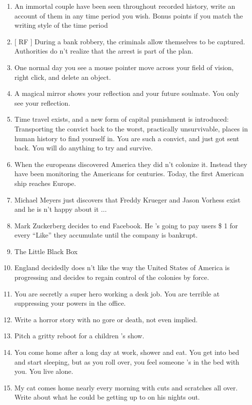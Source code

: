 \begin{enumerate}[noitemsep]
    \item An immortal couple have been seen throughout recorded history, write an account of them in any time period you wish. Bonus points if you match the writing style of the time period
    \item {[} RF {]} During a bank robbery, the criminals allow themselves to be captured. Authorities do n't realize that the arrest is part of the plan.
    \item One normal day you see a mouse pointer move across your field of vision, right click, and delete an object.
    \item A magical mirror shows your reflection and your future soulmate. You only see your reflection.
    \item Time travel exists, and a new form of capital punishment is introduced: Transporting the convict back to the worst, practically unsurvivable, places in human history to find yourself in. You are such a convict, and just got sent back. You will do anything to try and survive.
    \item When the europeans discovered America they did n't colonize it. Instead they have been monitoring the Americans for centuries. Today, the first American ship reaches Europe.
    \item Michael Meyers just discovers that Freddy Krueger and Jason Vorhess exist and he is n't happy about it ...
    \item Mark Zuckerberg decides to end Facebook. He 's going to pay users \$ 1 for every “Like” they accumulate until the company is bankrupt.
    \item The Little Black Box
    \item England decidedly does n't like the way the United States of America is progressing and decides to regain control of the colonies by force.
    \item You are secretly a super hero working a desk job. You are terrible at suppressing your powers in the office.
    \item Write a horror story with no gore or death, not even implied.
    \item Pitch a gritty reboot for a children 's show.
    \item You come home after a long day at work, shower and eat. You get into bed and start sleeping, but as you roll over, you feel someone 's in the bed with you. You live alone.
    \item My cat comes home nearly every morning with cuts and scratches all over. Write about what he could be getting up to on his nights out.

\end{enumerate}

